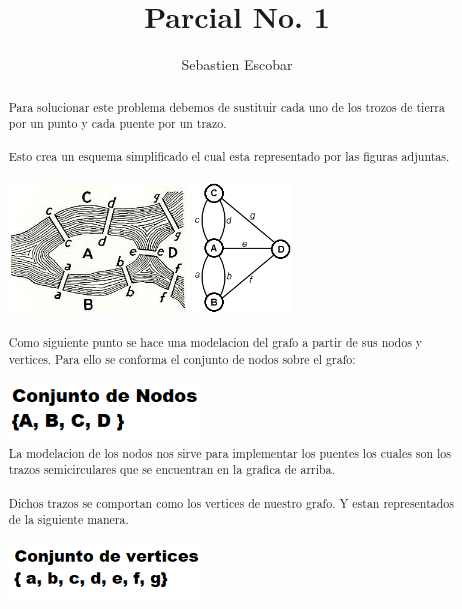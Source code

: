\documentclass[11pt,letterpaper,twocolumn]{article}
\begin{document}
\title{Parcial No. 1}
\author{Sebastien Escobar}
\maketitle


\renewcommand{\abstractname}{Pregunta 1}
\begin{abstract}
Para solucionar este problema debemos de sustituir cada uno de los trozos de tierra por un punto y cada puente por un trazo.
\\
\\Esto crea un esquema simplificado el cual esta representado por las figuras adjuntas.
\\
\\\includegraphics[height=3.5cm]{1}
\includegraphics[height=3.5cm]{2}
\\
\\Como siguiente punto se hace una modelacion del grafo a partir de sus nodos y vertices.
Para ello se conforma el conjunto de nodos sobre el grafo:
\\
\\\includegraphics[height=1.5cm]{3}
\\La modelacion de los nodos nos sirve para implementar los puentes los cuales son los trazos semicirculares que se encuentran en la grafica de arriba. 
\\
\\Dichos trazos se comportan como los vertices de nuestro grafo. Y estan representados de la siguiente manera.
\\
\\\includegraphics[height=1.5cm]{4}

\end{abstract}
\end{document}
